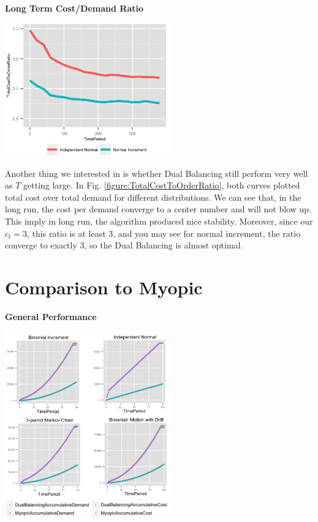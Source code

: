 \documentclass[twoside]{article}
\begin{document}
\begin{multicols}{2}
\begin{center}
  \textbf{Long Term Cost/Demand Ratio}
\end{center}
\begin{center}
  \label{figure:TotalCostToOrderRatio}
  \includegraphics[width=2.8in]{figures/TotalCostToOrderRatio.png}
\end{center}
Another thing we interested in is whether Dual Balancing still perform very well as $T$ getting large. In Fig. \ref{figure:TotalCostToOrderRatio}, both curves plotted total cost over total demand for different distributions. We can see that, in the long run, the cost per demand converge to a center number and will not blow up. This imply in long run, the algorithm produced nice stability. Moreover, since our $c_t=3$, this ratio is at least 3, and you may see for normal increment, the ratio converge to exactly 3, so the Dual Balancing is almost optimal. 

\section{Comparison to Myopic}

\begin{center}
  \textbf{General Performance}
\end{center}

\begin{center}
  \label{figure:AccumulativeDemandAndCost}
  \includegraphics[width=2.8in]{figures/AccumulativeDemandAndCost.png}
  \includegraphics[width=2.8in]{figures/key.png}
\end{center}


\end{multicols}
\end{document}
